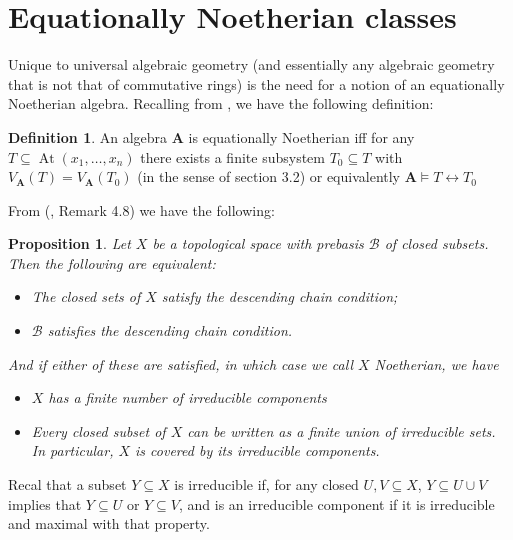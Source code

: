 \documentclass{article}
\theoremstyle{plain}
\newtheorem{proposition}[theorem]{Proposition}
\theoremstyle{definition}
\newtheorem{definition}{Definition}[section]
\begin{document}
\section{Equationally Noetherian classes}


Unique to universal algebraic geometry (and essentially any algebraic geometry that is not that of commutative rings) is the need for a notion of an equationally Noetherian algebra.
Recalling from \cite{daniyarova2011algebraicgeometryalgebraicstructures}, we have the following definition:

\begin{definition}
    An algebra $\mathbf{A}$ is equationally Noetherian iff for any $T\subseteq \operatorname{At}(x_1, \dots, x_n)$ there exists a finite subsystem $T_0 \subseteq T$ with $V_\mathbf{A}(T) = V_\mathbf{A}(T_0)$ (in the sense of section 3.2) or equivalently $\mathbf{A} \models T \leftrightarrow T_0$
\end{definition}

From (\cite{Daniyarova2008UnificationTI}, Remark 4.8) we have the following:

\begin{proposition} \label{prop:noethtopology}
    Let $X$ be a topological space with prebasis $\mathcal{B}$ of closed subsets.
    Then the following are equivalent:
    \begin{itemize}
        \item The closed sets of $X$ satisfy the descending chain condition;
        \item $\mathcal{B}$ satisfies the descending chain condition.
    \end{itemize}
    And if either of these are satisfied, in which case we call $X$ Noetherian, we have
    \begin{itemize}
        \item $X$ has a finite number of irreducible components
        \item Every closed subset of $X$ can be written as a finite union of irreducible sets.
        In particular, $X$ is covered by its irreducible components.
    \end{itemize}
\end{proposition}

Recal that a subset $Y \subseteq X$ is irreducible if, for any closed $U, V \subseteq X$, $Y \subseteq U \cup V$ implies that $Y \subseteq U$ or $Y \subseteq V$, and is an irreducible component if it is irreducible and maximal with that property.
\end{document}
